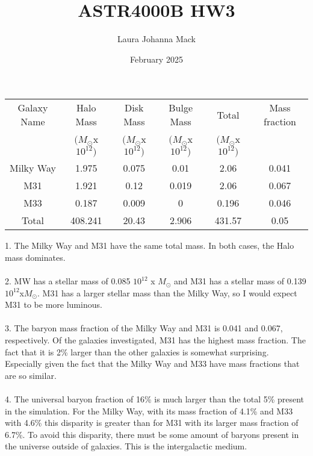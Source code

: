 \documentclass{article}
\title{ASTR4000B HW3}
\author{Laura Johanna Mack}
\date{February 2025}
\begin{document}
\maketitle


\begin{center}
    

\begin{tabular}{||c| c c c |c||c||} 
 \hline
 Galaxy Name & Halo Mass  & Disk Mass  & Bulge Mass  & Total   & Mass fraction\\ [0.5ex] 
  & $(M_\odot$x $10^{12})$ & $(M_\odot$x$10^{12})$ & $(M_\odot$x$10^{12})$ & $(M_\odot$x$10^{12})$\\
 \hline\hline
 Milky Way & 1.975 & 0.075 & 0.01 & 2.06 & 0.041\\ 
 \hline
 M31 & 1.921 & 0.12 & 0.019 & 2.06 & 0.067\\
 \hline
 M33 & 0.187 & 0.009 & 0 & 0.196 & 0.046\\
 \hline\hline
 Total & 408.241 & 20.43 & 2.906 & 431.57 & 0.05\\ 
 \hline 
\end{tabular}
\end{center}

1. The Milky Way and M31 have the same total mass. In both cases, the Halo mass dominates. \\ \\
2. MW has a stellar mass of 0.085 $10^{12}$ x $M_\odot$ and M31 has a stellar mass of 0.139 $10^{12} $x$ M_\odot$. M31 has a larger stellar mass than the Milky Way, so I would expect M31 to be more luminous. \\ \\
3. The baryon mass fraction of the Milky Way and M31 is 0.041 and 0.067, respectively. Of the galaxies investigated, M31 has the highest mass fraction. The fact that it is 2\% larger than the other galaxies is somewhat surprising. Especially given the fact that the Milky Way and M33 have mass fractions that are so similar. \\ \\
4. The universal baryon fraction of 16\% is much larger than the total 5\% present in the simulation. For the Milky Way, with its mass fraction of 4.1\% and M33 with 4.6\% this disparity is greater than for M31 with its larger mass fraction of 6.7\%. To avoid this disparity, there must be some amount of baryons present in the universe outside of galaxies. This is the intergalactic medium. 
\end{document}
